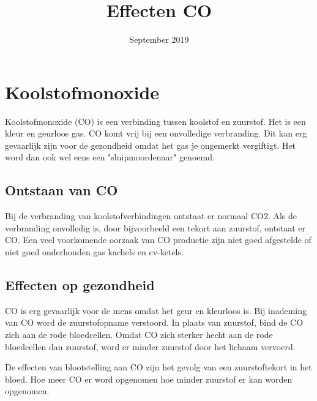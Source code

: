 \documentclass{article}
\title{Effecten CO}
\date{September 2019}
\begin{document}
\maketitle
\newpage
\section{Koolstofmonoxide}
Koolstofmonoxide (CO) is een verbinding tussen koolstof en zuurstof. Het is een kleur en geurloos gas. CO komt vrij bij een onvolledige verbranding. Dit kan erg gevaarlijk zijn voor de gezondheid omdat het gas je ongemerkt vergiftigt. Het word dan ook wel eens een "sluipmoordenaar" genoemd. 

\subsection{Ontstaan van CO}
Bij de verbranding van koolstofverbindingen ontstaat er normaal CO2. Als de verbranding onvolledig is, door bijvoorbeeld een tekort aan zuurstof, ontstaat er CO. Een veel voorkomende oorzaak van CO productie zijn niet goed afgestelde of niet goed onderhouden gas kachels en cv-ketels.

\subsection{Effecten op gezondheid}
CO is erg gevaarlijk voor de mens omdat het geur en kleurloos is. Bij inademing van CO word de zuurstofopname verstoord. In plaats van zuurstof, bind de CO zich aan de rode bloedcellen. Omdat CO zich sterker hecht aan de rode bloedcellen dan zuurstof, word er minder zuurstof door het lichaam vervoerd. 

De effecten van blootstelling aan CO zijn het gevolg van een zuurstoftekort in het bloed. Hoe meer CO er word opgenomen hoe minder zuurstof er kan worden opgenomen. 
\end{document}
